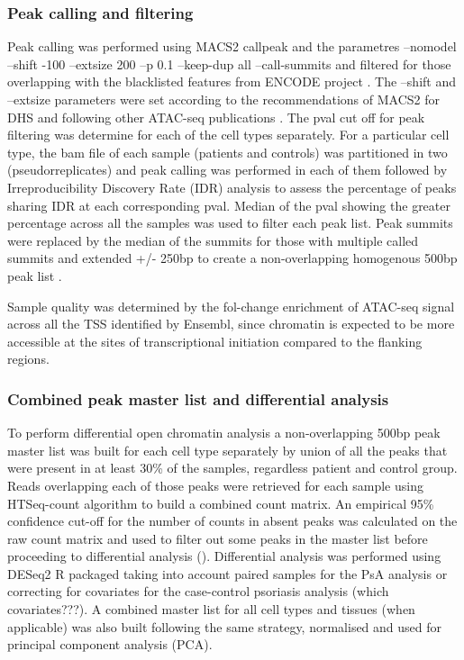 \subsubsection{Peak calling and filtering}
Peak calling was performed using MACS2  callpeak \parencite{} and the parametres --nomodel --shift -100 --extsize 200 --p 0.1 --keep-dup all --call-summits and filtered for those overlapping with the blacklisted features from ENCODE project \parencite{}. The --shift and --extsize parameters were set according to the recommendations of MACS2 for DHS and following other ATAC-seq publications \parencite{Buenrostro2015, Corces2016}. The pval cut off for peak filtering was determine for each of the cell types separately. 
For a particular cell type, the bam file of each sample (patients and controls) was partitioned in two (pseudorreplicates) and peak calling was performed in each of them followed by Irreproducibility Discovery Rate (IDR) analysis to assess the percentage of peaks sharing IDR at each corresponding pval. Median of the pval showing the greater percentage across all the samples was used to filter each peak list. Peak summits were replaced by the median of the summits for those with multiple called summits and extended +/- 250bp to create a non-overlapping homogenous 500bp peak list \parencite{Buenrostro2015, Corces2016}. 

Sample quality was determined by the fol-change enrichment of ATAC-seq signal across all the TSS identified by Ensembl, since chromatin is expected to be more accessible at the sites of transcriptional initiation compared to the flanking regions.  

\subsubsection{Combined peak master list and differential analysis}
To perform differential open chromatin analysis a non-overlapping 500bp peak master list was built for each cell type separately by union of all the peaks that were present in at least 30\% of the samples, regardless patient and control group. Reads overlapping each of those peaks were retrieved for each sample using HTSeq-count algorithm \parencite{} to build a combined count matrix. An empirical 95\% confidence cut-off for the number of counts in absent peaks was calculated on the raw count matrix and used to filter out some peaks in the master list before proceeding to differential analysis (\parencite{Xinmin2005,Jonker2014}). Differential analysis was performed using DESeq2 R packaged taking into account paired samples for the PsA analysis or correcting for covariates for the case-control psoriasis analysis (which covariates???)\parencite{Love2014}.
A combined master list for all cell types and tissues (when applicable) was also built following the same strategy, normalised and used for principal component analysis (PCA). 





